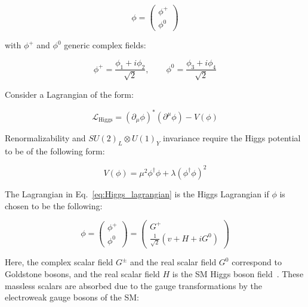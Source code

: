 			\begin{equation}
			\label{eq:Higgs_field}
				\phi = 
				\begin{pmatrix}
					\phi^+ \\ \phi^0
				\end{pmatrix} 
			\end{equation}

			\noindent with $\phi^+$ and $\phi^0$ generic complex fields: 

			\begin{equation}
				\phi^+ = \frac{\phi_1 + i \phi_2}{\sqrt{2}},  \qquad \phi^0 = \frac{\phi_3 + i \phi_4}{\sqrt{2}}
			\end{equation}

			\noindent Consider a Lagrangian of the form: 

			\begin{equation}
			\label{eq:Higgs_lagrangian}
				\mathcal{L_{\mathrm{Higgs}}} = ( \partial_{\mu} \phi )^* \left ( \partial^{\mu} \phi \right ) - V(\phi)
			\end{equation}

			\noindent Renormalizability and $SU(2)_L \otimes U(1)_Y$ invariance require the Higgs potential to be of the following form: 

			\begin{equation}
			\label{eq:Higgs_potential}
				V(\phi) = \mu^2  \phi^\dagger \phi + \lambda \left ( \phi^\dagger \phi \right )^2 
			\end{equation}

			\noindent The Lagrangian in Eq.~\ref{eq:Higgs_lagrangian} is the Higgs Lagrangian if $\phi$ is chosen to be the following:

			\begin{equation*}
				\phi = 
				\begin{pmatrix}
					\phi^+ \\ \phi^0
				\end{pmatrix} 
				=
				\begin{pmatrix}
					G^+ \\ \frac{1}{\sqrt{2}} \left ( v + H + iG^0 \right )
				\end{pmatrix}
			\end{equation*}

			\noindent Here, the complex scalar field $G^\pm$ and the real scalar field $G^0$ correspond to Goldstone bosons, and the real scalar field $H$ is the \ac{SM} Higgs boson field~\cite{Goldstone1962}. These massless scalars are absorbed due to the gauge transformations by the electroweak gauge bosons of the \ac{SM}:

